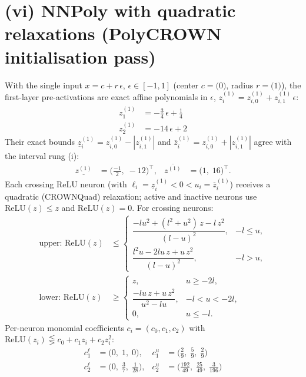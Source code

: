 \documentclass[11pt]{article}
\begin{document}
\section{(vi) NNPoly with quadratic relaxations (PolyCROWN initialisation pass)}
With the single input $x = c + r\,\epsilon$, $\epsilon \in [-1, 1]$ (center $c = \bigl(0\bigr)$, radius $r = \bigl(1\bigr)$), the first-layer pre-activations are exact affine polynomials in $\epsilon$, $z^{(1)}_i = z^{(1)}_{i,0} + z^{(1)}_{i,1}\,\epsilon$:
\begin{align*}
z^{(1)}_{1} &= -\frac{3}{4}\,\epsilon + \frac{1}{4} \\
z^{(1)}_{2} &= -14\,\epsilon + 2
\end{align*}
Their exact bounds $\underline{z}^{(1)}_i = z^{(1)}_{i,0} - |z^{(1)}_{i,1}|$ and $\overline{z}^{(1)}_i = z^{(1)}_{i,0} + |z^{(1)}_{i,1}|$ agree with the interval rung (i):
\begin{align*}
\underline{z^{(1)}} &= \bigl(\frac{-1}{2},\; -12\bigr)^{\!\top}, & \overline{z^{(1)}} &= \bigl(1,\; 16\bigr)^{\!\top}.
\end{align*}
Each crossing ReLU neuron (with $\ell_i = \underline{z}^{(1)}_i < 0 < u_i = \overline{z}^{(1)}_i$)
receives a quadratic (CROWNQuad) relaxation; active and inactive neurons use $\mathrm{ReLU}(z) \le z$
and $\mathrm{ReLU}(z) = 0$. For crossing neurons:
\begin{align*}
\text{upper: } \mathrm{ReLU}(z) &\le \begin{cases} \dfrac{-l u^2 + (l^2 + u^2)\, z - l\, z^2}{(l - u)^2}, & -l \le u, \\[3mm] \dfrac{l^2 u - 2 l u\, z + u\, z^2}{(l - u)^2}, & -l > u, \end{cases} \\[2mm]
\text{lower: } \mathrm{ReLU}(z) &\ge \begin{cases} z, & u \ge -2l, \\[3mm] \dfrac{-l u\, z + u\, z^2}{u^2 - l u}, & -l < u < -2l, \\[3mm] 0, & u \le -l. \end{cases}
\end{align*}
Per-neuron monomial coefficients $c_i = (c_0, c_1, c_2)$ with $\mathrm{ReLU}(z_i) \lesseqgtr c_0 + c_1 z_i + c_2 z_i^2$:
\begin{align*}
c^{\ell}_{1} &= \bigl(0,\; 1,\; 0\bigr), & c^{u}_{1} &= \bigl(\frac{2}{9},\; \frac{5}{9},\; \frac{2}{9}\bigr) \\
c^{\ell}_{2} &= \bigl(0,\; \frac{3}{7},\; \frac{1}{28}\bigr), & c^{u}_{2} &= \bigl(\frac{192}{49},\; \frac{25}{49},\; \frac{3}{196}\bigr)
\end{align*}
\end{document}
